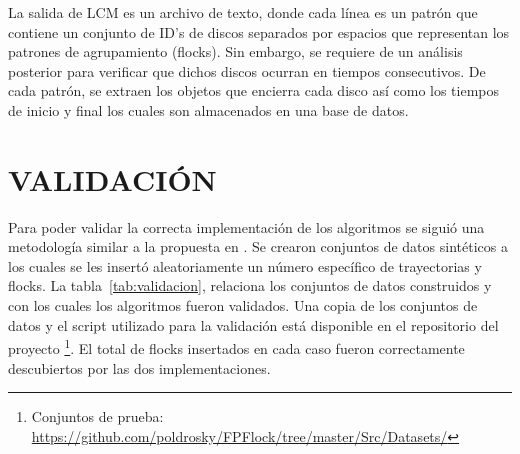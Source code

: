  La salida de LCM es un archivo de texto, donde cada línea es un patrón que contiene un conjunto de 
ID's de discos separados por espacios que representan los patrones de agrupamiento (flocks). Sin 
embargo, se requiere de un análisis posterior para verificar que dichos discos ocurran en tiempos 
consecutivos.  De cada patrón, se extraen los objetos que encierra cada disco así como los tiempos 
de inicio y final los cuales son almacenados en una base de datos.
 
\section{VALIDACIÓN}
 
 Para poder validar la correcta implementación de los algoritmos se siguió una metodología similar a 
la propuesta en \cite{benkert2008reporting}. Se crearon conjuntos de datos sintéticos a los cuales 
se les insertó aleatoriamente un número específico de trayectorias y flocks. La 
tabla~\ref{tab:validacion}, relaciona los conjuntos de datos construidos y con los cuales los 
algoritmos fueron validados.  Una copia de los conjuntos de datos y el script utilizado para la 
validación está disponible en el repositorio del proyecto \footnote{Conjuntos de prueba: 
\url{https://github.com/poldrosky/FPFlock/tree/master/Src/Datasets/}}. El total de flocks insertados 
en cada caso fueron correctamente descubiertos por las dos implementaciones.
 
\begin{table}
\caption{Conjunto de datos validación}
\label{tab:validacion}
\centering
{}\par
\bigskip
\end{table}

